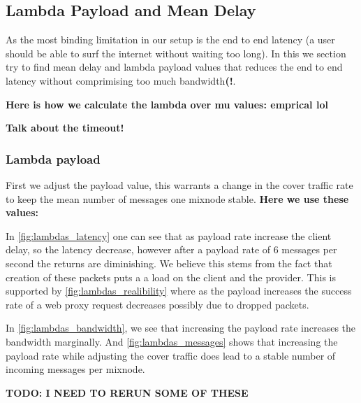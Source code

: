 \documentclass[a4paper,11pt,oneside]{report}
\begin{document}
\subsection{Lambda Payload and Mean Delay}
As the most binding limitation in our setup is the end to end latency (a user should be able to surf the internet without waiting too long). In this we section try to find mean delay and lambda payload values that reduces the end to end latency without comprimising too much bandwidth\textbf{(!}.

\textbf{Here is how we calculate the lambda over mu values: emprical lol}

\textbf{Talk about the timeout!}

\subsubsection{Lambda payload}

First we adjust the payload value, this warrants a change in the cover traffic rate to keep the mean number of messages one mixnode stable. \textbf{Here we use these values: }

In \autoref{fig:lambdas_latency} one can see that as payload rate increase the client delay, so the latency decrease, however after a payload rate of 6 messages per second the returns are diminishing. We believe this stems from the fact that creation of these packets puts a a load on the client and the provider. This is supported by \autoref{fig:lambdas_realibility} where as the payload increases the success rate of a web proxy request decreases possibly due to dropped packets.

In \autoref{fig:lambdas_bandwidth}, we see that increasing the payload rate increases the bandwidth marginally. And \autoref{fig:lambdas_messages} shows that increasing the payload rate while adjusting the cover traffic does lead to a stable number of incoming messages per mixnode.

\textbf{TODO: I NEED TO RERUN SOME OF THESE}
\end{document}
